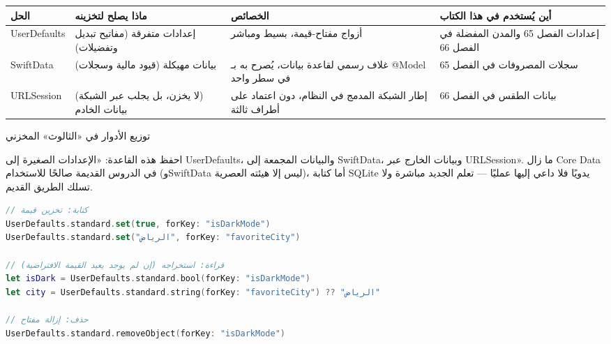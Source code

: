 


\begin{center}
\begin{tabularx}{\linewidth}{|X|X|X|X|}
\hline
\textbf{الحل} & \textbf{ماذا يصلح لتخزينه} & \textbf{الخصائص} & \textbf{أين يُستخدم في هذا الكتاب} \tabularnewline
\hline
UserDefaults & إعدادات متفرقة (مفاتيح تبديل وتفضيلات) & أزواج مفتاح-قيمة، بسيط ومباشر & إعدادات الفصل 65 والمدن المفضلة في الفصل 66 \tabularnewline
SwiftData & بيانات مهيكلة (قيود مالية وسجلات) & غلاف رسمي لقاعدة بيانات، يُصرح به بـ @Model في سطر واحد & سجلات المصروفات في الفصل 65 \tabularnewline
URLSession & (لا يخزن، بل يجلب عبر الشبكة) بيانات الخادم & إطار الشبكة المدمج في النظام، دون اعتماد على أطراف ثالثة & بيانات الطقس في الفصل 66 \tabularnewline
\hline
\end{tabularx}
\end{center}

\begin{center}\small\color{gray}توزيع الأدوار في «الثالوث» المخزني\end{center}

احفظ هذه القاعدة: «الإعدادات الصغيرة إلى UserDefaults، والبيانات المجمعة إلى SwiftData، وبيانات الخارج عبر URLSession». ما زال Core Data في الدروس القديمة صالحًا للاستخدام (وSwiftData ليس إلا هيئته العصرية)، أما كتابة SQLite يدويًا فلا داعي إليها عمليًا — تعلم الجديد مباشرة ولا تسلك الطريق القديم.


\begin{lstlisting}[language=Swift]
// كتابة: تخزين قيمة
UserDefaults.standard.set(true, forKey: "isDarkMode")
UserDefaults.standard.set("الرياض", forKey: "favoriteCity")

// قراءة: استخراجه (إن لم يوجد يعيد القيمة الافتراضية)
let isDark = UserDefaults.standard.bool(forKey: "isDarkMode")
let city = UserDefaults.standard.string(forKey: "favoriteCity") ?? "الرياض"

// حذف: إزالة مفتاح
UserDefaults.standard.removeObject(forKey: "isDarkMode")
\end{lstlisting}

